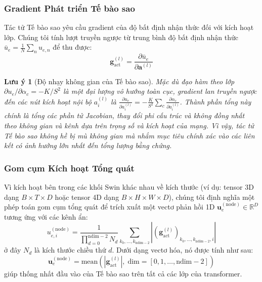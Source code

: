 \documentclass[11pt]{article}
\newtheorem{remark}{Lưu ý}
\newcommand{\R}{\mathbb{R}}
\begin{document}
\subsubsection{Gradient Phát triển Tế bào sao}

Tác tử Tế bào sao yêu cầu gradient của độ bất định nhận thức đối với kích hoạt lớp. Chúng tôi tính lượt truyền ngược từ trung bình độ bất định nhận thức $\bar{u}_e = \frac{1}{N}\sum_n u_{e,n}$ để thu được:
\begin{equation}\label{eq:grad_ue}
    \bm{g}_{\text{act}}^{(l)} = \frac{\partial \bar{u}_e}{\partial \bm{a}^{(l)}}
\end{equation}

\begin{remark}[Độ nhạy không gian của Tế bào sao]
Mặc dù đạo hàm theo lớp $\partial u_e / \partial \alpha_c = -K/S^2$ là một đại lượng vô hướng toàn cục, gradient lan truyền ngược đến các nút kích hoạt nội bộ $a_i^{(l)}$ là $\frac{\partial u_e}{\partial a_i^{(l)}} = -\frac{K}{S^2} \sum_c \frac{\partial \alpha_c}{\partial a_i^{(l)}}$. Thành phần tổng này chính là tổng các phần tử Jacobian, thay đổi phi cấu trúc và không đồng nhất theo không gian và kênh dựa trên trọng số và kích hoạt của mạng. Vì vậy, tác tử Tế bào sao không hề bị mù không gian mà nhắm mục tiêu chính xác vào các liên kết có ảnh hưởng lớn nhất đến tổng lượng bằng chứng.
\end{remark}

\subsubsection{Gom cụm Kích hoạt Tổng quát}

Vì kích hoạt bên trong các khối Swin khác nhau về kích thước (ví dụ: tensor 3D dạng $B \times T \times D$ hoặc tensor 4D dạng $B \times H \times W \times D$), chúng tôi định nghĩa một phép toán gom cụm tổng quát để trích xuất một vectơ phản hồi 1D $\bm{u}_e^{(\text{node})} \in \R^{D}$ tương ứng với các kênh ẩn:
\begin{equation}\label{eq:node_pool}
    u_{e,i}^{(\text{node})} = \frac{1}{\prod_{d=0}^{\text{ndim}-2} N_d} \sum_{k_0, \dots, k_{\text{ndim}-2}} \left|\left(\bm{g}_{\text{act}}^{(l)}\right)_{k_0, \dots, k_{\text{ndim}-2}, i}\right|
\end{equation}
ở đây $N_d$ là kích thước chiều thứ $d$. Dưới dạng vectơ hóa, nó được tính như sau:
\begin{equation}\label{eq:node_pool_code}
    \bm{u}_e^{(\text{node})} = \text{mean}\!\left(\left|\bm{g}_{\text{act}}^{(l)}\right|,\; \text{dim} = [0, 1, \dots, \text{ndim}-2]\right)
\end{equation}
giúp thống nhất đầu vào của Tế bào sao trên tất cả các lớp của transformer.
\end{document}
